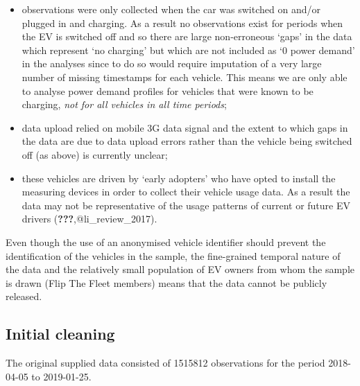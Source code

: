 \documentclass[]{article}
\providecommand{\tightlist}{%
  \setlength{\itemsep}{0pt}\setlength{\parskip}{0pt}}
\begin{document}
\begin{itemize}
\tightlist
\item
  observations were only collected when the car was switched on and/or plugged in and charging. As a result no observations exist for periods when the EV is switched off and so there are large non-erroneous `gaps' in the data which represent `no charging' but which are not included as `0 power demand' in the analyses since to do so would require imputation of a very large number of missing timestamps for each vehicle. This means we are only able to analyse power demand profiles for vehicles that were known to be charging, \emph{not for all vehicles in all time periods};
\item
  data upload relied on mobile 3G data signal and the extent to which gaps in the data are due to data upload errors rather than the vehicle being switched off (as above) is currently unclear;
\item
  these vehicles are driven by `early adopters' who have opted to install the measuring devices in order to collect their vehicle usage data. As a result the data may not be representative of the usage patterns of current or future EV drivers ({\textbf{???}},@li\_review\_2017).
\end{itemize}

Even though the use of an anonymised vehicle identifier should prevent the identification of the vehicles in the sample, the fine-grained temporal nature of the data and the relatively small population of EV owners from whom the sample is drawn (Flip The Fleet members) means that the data cannot be publicly released.

\hypertarget{cleaning}{%
\subsection{Initial cleaning}\label{cleaning}}

The original supplied data consisted of 1515812 observations for the period 2018-04-05 to 2019-01-25.
\end{document}
